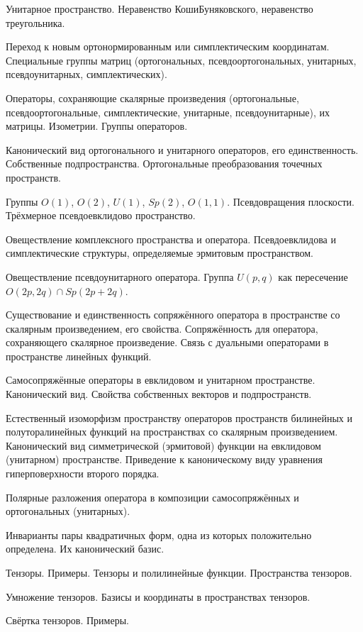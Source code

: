 \documentclass[a4paper]{article}
\begin{document}
\begin{nums}{-2}
\item Унитарное пространство. Неравенство Коши\ч Буняковского, неравенство треугольника.
\item Переход к новым ортонормированным или симплектическим координатам. Специальные группы матриц
(ортогональных, псевдоортогональных, унитарных, псевдоунитарных, симплектических).
\item Операторы, сохраняющие скалярные произведения (ортогональные, псевдоортогональные,
симплектические, унитарные, псевдоунитарные), их матрицы. Изометрии. Группы операторов.
\item Канонический вид ортогонального и унитарного операторов, его единственность.
Собственные подпространства. Ортогональные преобразования точечных пространств.
\item Группы $O(1)$, $O(2)$, $U(1)$, $Sp(2)$, $O(1,1)$. Псевдовращения плоскости.
Трёхмерное псевдоевклидово пространство.
\item Овеществление комплексного пространства и оператора. Псевдоевклидова и симплектические структуры,
определяемые эрмитовым пространством.
\item Овеществление псевдоунитарного оператора. Группа $U(p,q)$ как пересечение $O(2p,2q) \cap Sp(2p+2q)$.
\item Существование и единственность сопряжённого оператора в пространстве со скалярным произведением,
его свойства. Сопряжённость для оператора, сохраняющего скалярное произведение. Связь с дуальными операторами
в пространстве линейных функций.
\item Самосопряжённые операторы в евклидовом и унитарном пространстве. Канонический вид.
Свойства собственных векторов и подпространств.
\item Естественный изоморфизм пространству операторов пространств билинейных и полуторалинейных
функций на пространствах со скалярным произведением. Канонический вид симметрической (эрмитовой)
функции на евклидовом (унитарном) пространстве. Приведение к каноническому виду уравнения гиперповерхности
второго порядка.
\item Полярные разложения оператора в композиции самосопряжённых и ортогональных (унитарных).
\item Инварианты пары квадратичных форм, одна из которых положительно определена. Их канонический базис.
\item Тензоры. Примеры. Тензоры и полилинейные функции. Пространства тензоров.
\item Умножение тензоров. Базисы и координаты в пространствах тензоров.
\item Свёртка тензоров. Примеры.

\end{nums}
\end{document}
